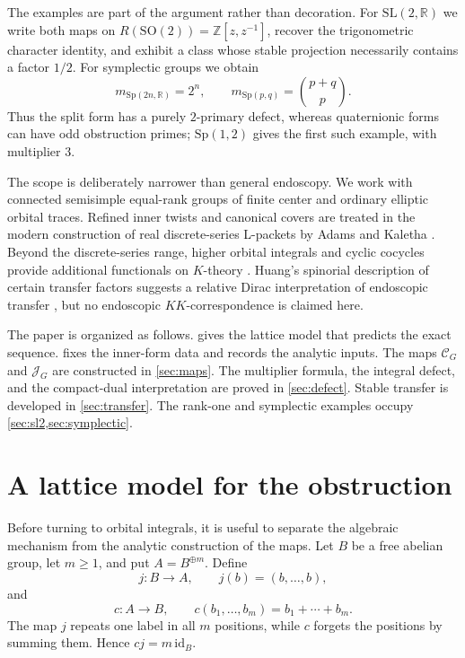 \documentclass[11pt]{amsart}
\theoremstyle{definition}
\theoremstyle{remark}
\begin{document}
The examples are part of the argument rather than decoration.  For
\(\mathrm{SL}(2,\mathbb R)\) we write both maps on
\(R(\mathrm{SO}(2))=\mathbb Z[z,z^{-1}]\), recover the trigonometric character
identity, and exhibit a class whose stable projection necessarily contains a
factor \(1/2\).  For symplectic groups we obtain
\[
  m_{\mathrm{Sp}(2n,\mathbb R)}=2^n,
  \qquad
  m_{\mathrm{Sp}(p,q)}=\binom{p+q}{p}.
\]
Thus the split form has a purely \(2\)-primary defect, whereas quaternionic
forms can have odd obstruction primes; \(\mathrm{Sp}(1,2)\) gives the first
such example, with multiplier \(3\).

The scope is deliberately narrower than general endoscopy.  We work with
connected semisimple equal-rank groups of finite center and ordinary elliptic
orbital traces.  Refined inner twists and canonical covers are treated in the
modern construction of real discrete-series L-packets by Adams and Kaletha
\cite[Sections~3--5]{AdamsKaletha2026}.  Beyond the discrete-series range,
higher orbital integrals and cyclic cocycles provide additional functionals on
\(K\)-theory \cite{SongTang2025}.  Huang's spinorial description of certain
transfer factors suggests a relative Dirac interpretation of endoscopic
transfer \cite[Theorem~1.1]{Huang2021}, but no endoscopic
\(KK\)-correspondence is claimed here.

The paper is organized as follows.   gives the lattice
model that predicts the exact sequence.   fixes the inner-form
data and records the analytic inputs.  The maps \(\mathcal C_G\) and
\(\mathcal J_G\) are constructed in \cref{sec:maps}.  The multiplier formula,
the integral defect, and the compact-dual interpretation are proved in
\cref{sec:defect}.  Stable transfer is developed in \cref{sec:transfer}.  The
rank-one and symplectic examples occupy \cref{sec:sl2,sec:symplectic}.

\section{A lattice model for the obstruction}\label{sec:lattice-model}

Before turning to orbital integrals, it is useful to separate the algebraic
mechanism from the analytic construction of the maps.  Let \(B\) be a free
abelian group, let \(m\geq1\), and put \(A=B^{\oplus m}\).  Define
\[
  j:B\longrightarrow A,
  \qquad
  j(b)=(b,\ldots,b),
\]
and
\[
  c:A\longrightarrow B,
  \qquad
  c(b_1,\ldots,b_m)=b_1+\cdots+b_m.
\]
The map \(j\) repeats one label in all \(m\) positions, while \(c\) forgets the
positions by summing them.  Hence \(cj=m\,\mathrm{id}_B\).
\end{document}
